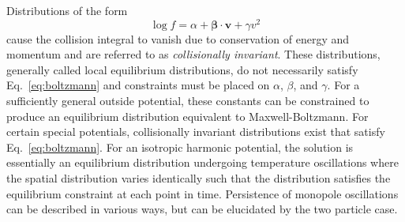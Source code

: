 \documentclass[%
 reprint,
 amsmath,amssymb,
 aps,
]{revtex4-1}
\begin{document}
Distributions of the form
\begin{equation}
\log f = \alpha + \mathbf{\beta}\cdot\mathbf{v}+\gamma v^2
\label{eq:collisioninvariant}
\end{equation}
cause the collision integral to vanish due to conservation of energy and momentum and are referred to as \textit{collisionally invariant}. These distributions, generally called local equilibrium distributions, do not necessarily satisfy Eq.~\ref{eq:boltzmann} and constraints must be placed on $\alpha$, $\beta$, and $\gamma$. For a sufficiently general outside potential, these constants can be constrained to produce an equilibrium distribution equivalent to Maxwell-Boltzmann. For certain special potentials, collisionally invariant distributions exist that satisfy Eq.~\ref{eq:boltzmann}. For an isotropic harmonic potential, the solution is essentially an equilibrium distribution undergoing temperature oscillations where the spatial distribution varies identically such that the distribution satisfies the equilibrium constraint at each point in time. Persistence of monopole oscillations can be described in various ways, but can be elucidated by the two particle case. 
\end{document}
